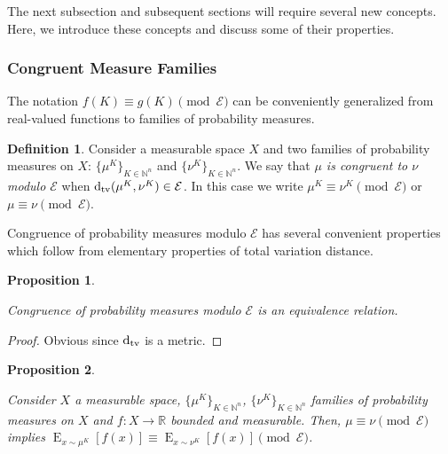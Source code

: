 \documentclass{article}
\numberwithin{equation}{section}
\theoremstyle{definition}
\newtheorem{definition}{Definition}[section]
\theoremstyle{plain}
\newtheorem{proposition}{Proposition}[section]
\DeclareMathOperator{\E}{E}
\newcommand{\Dtv}{\operatorname{d}_{\textnormal{tv}}}
\newcommand{\Nats}{\mathbb{N}}
\newcommand{\Reals}{\mathbb{R}}
\newcommand{\Fall}{\mathcal{E}}
\begin{document}
The next subsection and subsequent sections will require several new concepts. Here, we introduce these concepts and discuss some of their properties.

\subsubsection{Congruent Measure Families}

The notation $f(K) \equiv g(K) \pmod \Fall$ can be conveniently generalized from real-valued functions to families of probability measures.

\begin{samepage}
\begin{definition}

Consider a measurable space $X$ and two families of probability measures on $X$: $\{\mu^K\}_{K \in \Nats^n}$ and $\{\nu^K\}_{K \in \Nats^n}$. We say that \emph{$\mu$ is congruent to $\nu$ modulo $\Fall$} when $\Dtv(\mu^K,\nu^K) \in \Fall$. In this case we write $\mu^K \equiv \nu^K \pmod \Fall$ or $\mu \equiv \nu \pmod \Fall$.

\end{definition}
\end{samepage}

Congruence of probability measures modulo $\Fall$ has several convenient properties which follow from elementary properties of total variation distance.

\begin{samepage}
\begin{proposition}
\label{prp:prob_cong_eq}

Congruence of probability measures modulo $\Fall$ is an equivalence relation.

\end{proposition}
\end{samepage}

\begin{proof}

Obvious since $\Dtv$ is a metric.
\end{proof}

\begin{samepage}
\begin{proposition}
\label{prp:prob_cong_ev}

Consider $X$ a measurable space, $\{\mu^K\}_{K \in \Nats^n}$, $\{\nu^K\}_{K \in \Nats^n}$ families of probability measures on $X$ and $f: X \rightarrow \Reals$ bounded and measurable. Then, $\mu \equiv \nu \pmod \Fall$ implies $\E_{x \sim \mu^K}[f(x)] \equiv \E_{x \sim \nu^K}[f(x)] \pmod \Fall$.

\end{proposition}
\end{samepage}
\end{document}

